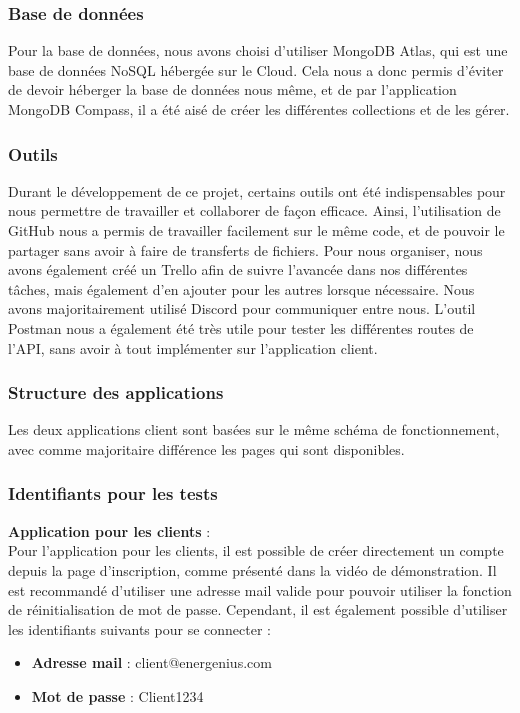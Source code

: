 \documentclass[../rapport.tex]{subfiles}
\begin{document}
\subsubsection{Base de données}
Pour la base de données, nous avons choisi d'utiliser MongoDB Atlas, qui est une base de données NoSQL hébergée sur le Cloud. Cela nous a donc permis d'éviter de devoir héberger la base de données nous même, et de par l'application MongoDB Compass, il a été aisé de créer les différentes collections et de les gérer. 

\subsubsection{Outils}
Durant le développement de ce projet, certains outils ont été indispensables pour nous permettre de travailler et collaborer de façon efficace. Ainsi, l'utilisation de GitHub nous a permis de travailler facilement sur le même code, et de pouvoir le partager sans avoir à faire de transferts de fichiers. Pour nous organiser, nous avons également créé un Trello afin de suivre l'avancée dans nos différentes tâches, mais également d'en ajouter pour les autres lorsque nécessaire. Nous avons majoritairement utilisé Discord pour communiquer entre nous. L'outil Postman nous a également été très utile pour tester les différentes routes de l'API, sans avoir à tout implémenter sur l'application client.

\subsubsection{Structure des applications}
Les deux applications client sont basées sur le même schéma de fonctionnement, avec comme majoritaire différence les pages qui sont disponibles. 

\subsubsection{Identifiants pour les tests}
\textbf{Application pour les clients} : \\ 
Pour l'application pour les clients, il est possible de créer directement un compte depuis la page d'inscription, comme présenté dans la vidéo de démonstration. Il est recommandé d'utiliser une adresse mail valide pour pouvoir utiliser la fonction de réinitialisation de mot de passe. Cependant, il est également possible d'utiliser les identifiants suivants pour se connecter :

\begin{itemize}
  \item \textbf{Adresse mail} : client@energenius.com
  \item \textbf{Mot de passe} : Client1234
\end{itemize}
\end{document}

